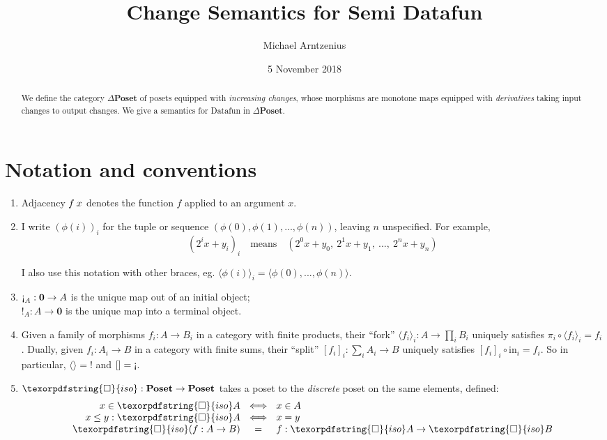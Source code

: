 \documentclass{rntz}\usepackage[a5]{rntzgeometry}\usepackage[fullwidth=13cm,width=315pt]{narrow}
\title{Change Semantics for Semi\naive{} Datafun}
\author{Michael Arntzenius}
\date{5 November 2018}
\newcommand\<{\mskip 4mu plus 4mu minus 1mu}
\newcommand\cat\textbf
\newcommand\CP{\cat{\texorpdfstring{$\Delta$Poset}{DeltaPoset}}}
\newcommand\Poset{\cat{Poset}}
\newcommand\initO{\ensuremath{\mathbold{0}}}
\newcommand\initE{\mathop{\text{\textexclamdown}}}
\newcommand\termI{\mathop{!}}
\newcommand\injc{\textrm{in}}
\newcommand\iso{\texorpdfstring{\ensuremath{\square}}{iso}}
\newcommand\isof{\iso}
\newcommand\fork[1]{\langle{#1}\rangle}
\newcommand\krof[1]{[{#1}]}
\begin{document}
\maketitle
\begin{abstract}
  We define the category \CP{} of posets equipped with \emph{increasing
    changes}, whose morphisms are monotone maps equipped with \emph{derivatives}
  taking input changes to output changes. We give a semantics for Datafun in
  \CP.
\end{abstract}


\section{Notation and conventions}

\begin{enumerate}
\item Adjacency $f\<x$ denotes the function $f$ applied to an argument $x$.

  \newcommand\iexpr{\phi}
\item I write $(\iexpr(i))_i$ for the tuple or sequence $(\iexpr(0), \iexpr(1),
  ..., \iexpr(n))$, leaving $n$ unspecified. For example,
  \[ (2^ix + y_i)_i \quad\text{means}\quad
  (2^0x + y_0,~ 2^1x + y_1,~ ...,~ 2^nx + y_n) \]

  \noindent
  I also use this notation with other braces, eg. $\fork{\iexpr(i)}_i =
  \fork{\iexpr(0), ..., \iexpr(n)}$.

\item $\initE_A : \initO \to A$ is the unique map out of an initial object;\\
  $\termI_A : A \to \initO$ is the unique map into a terminal object.

\item Given a family of morphisms $f_i : A \to B_i$ in a category with finite
  products, their ``fork'' $\fork{f_i}_i : A \to \textstyle\prod_{i} B_i$
  uniquely satisfies $\pi_i \circ \fork{f_i}_i = f_i$. Dually, given $f_i :
  A_i \to B$ in a category with finite sums, their ``split'' $\krof{f_i}_i :
  \sum_i A_i \to B$ uniquely satisfies $\krof{f_i}_i \circ \injc_i = f_i$. So
  in particular, $\fork{} = \termI$ and $\krof{} = \initE$.

\item $\iso : \Poset \to \Poset$ takes a poset to the \emph{discrete} poset on
  the same elements, defined:
  \[\setlength\arraycolsep{.33em}
  \begin{array}{rcl}
    x \in \isof A &\iff& x \in A\\
    x \le y : \isof A &\iff& x = y\\
    \isof(f : A \to B) &=& f : \isof A \to \isof B
  \end{array}\]
\end{enumerate}
\end{document}
